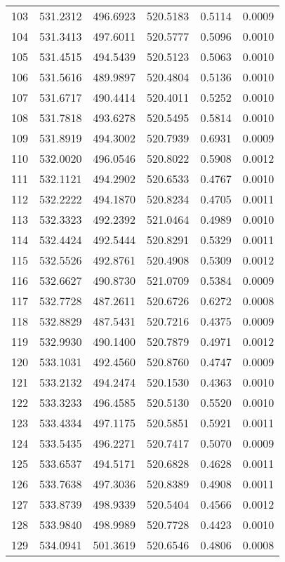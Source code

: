 \documentclass{article}
\begin{document}
\begin{longtable}{|c|c|c|c|c|c|}
103 & 531.2312 & 496.6923 & 520.5183 & 0.5114 & 0.0009 \\
104 & 531.3413 & 497.6011 & 520.5777 & 0.5096 & 0.0010 \\
105 & 531.4515 & 494.5439 & 520.5123 & 0.5063 & 0.0010 \\
106 & 531.5616 & 489.9897 & 520.4804 & 0.5136 & 0.0010 \\
107 & 531.6717 & 490.4414 & 520.4011 & 0.5252 & 0.0010 \\
108 & 531.7818 & 493.6278 & 520.5495 & 0.5814 & 0.0010 \\
109 & 531.8919 & 494.3002 & 520.7939 & 0.6931 & 0.0009 \\
110 & 532.0020 & 496.0546 & 520.8022 & 0.5908 & 0.0012 \\
111 & 532.1121 & 494.2902 & 520.6533 & 0.4767 & 0.0010 \\
112 & 532.2222 & 494.1870 & 520.8234 & 0.4705 & 0.0011 \\
113 & 532.3323 & 492.2392 & 521.0464 & 0.4989 & 0.0010 \\
114 & 532.4424 & 492.5444 & 520.8291 & 0.5329 & 0.0011 \\
115 & 532.5526 & 492.8761 & 520.4908 & 0.5309 & 0.0012 \\
116 & 532.6627 & 490.8730 & 521.0709 & 0.5384 & 0.0009 \\
117 & 532.7728 & 487.2611 & 520.6726 & 0.6272 & 0.0008 \\
118 & 532.8829 & 487.5431 & 520.7216 & 0.4375 & 0.0009 \\
119 & 532.9930 & 490.1400 & 520.7879 & 0.4971 & 0.0012 \\
120 & 533.1031 & 492.4560 & 520.8760 & 0.4747 & 0.0009 \\
121 & 533.2132 & 494.2474 & 520.1530 & 0.4363 & 0.0010 \\
122 & 533.3233 & 496.4585 & 520.5130 & 0.5520 & 0.0010 \\
123 & 533.4334 & 497.1175 & 520.5851 & 0.5921 & 0.0011 \\
124 & 533.5435 & 496.2271 & 520.7417 & 0.5070 & 0.0009 \\
125 & 533.6537 & 494.5171 & 520.6828 & 0.4628 & 0.0011 \\
126 & 533.7638 & 497.3036 & 520.8389 & 0.4908 & 0.0011 \\
127 & 533.8739 & 498.9339 & 520.5404 & 0.4566 & 0.0012 \\
128 & 533.9840 & 498.9989 & 520.7728 & 0.4423 & 0.0010 \\
129 & 534.0941 & 501.3619 & 520.6546 & 0.4806 & 0.0008 \\

\end{longtable}
\end{document}
